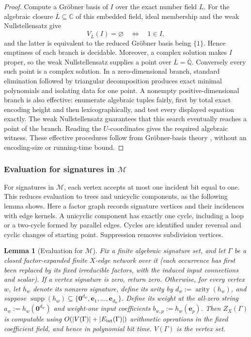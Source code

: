 \documentclass[11pt,letterpaper,onecolumn]{article}
\theoremstyle{plain}
\newtheorem{lemma}[lemma]{Lemma}
\theoremstyle{definition}
\theoremstyle{remark}
\newcommand{\AlgNums}{\overline{\mathbb Q}}
\newcommand{\cM}{\mathscr M}
\newcommand{\supp}{\operatorname{supp}}
\newcommand{\arity}{\operatorname{arity}}
\newcommand{\zero}{\mathbf 0}
\begin{document}
\begin{proof}
Compute a Gr\"obner basis of \(I\) over the exact number field \(L\).
For the algebraic closure \(\overline L\subseteq\mathbb C\) of this
embedded field, ideal membership and the weak Nullstellensatz give
\[
 V_{\overline L}(I)=\varnothing
 \quad\Longleftrightarrow\quad
 1\in I,
\]
and the latter is equivalent to the reduced Gr\"obner basis being
\(\{1\}\).  Hence emptiness of each branch is decidable.  Moreover, a
complex solution makes \(I\) proper, so the weak Nullstellensatz supplies
a point over \(\overline L=\AlgNums\). Conversely every such point is a
complex solution.  In a zero-dimensional branch, standard elimination
followed by triangular decomposition produces exact minimal polynomials and
isolating data for one point.  A nonempty positive-dimensional branch is
also effective: enumerate algebraic tuples fairly, first by total exact
encoding height and then lexicographically, and test every displayed
equation exactly.  The weak Nullstellensatz guarantees that this search
eventually reaches a point of the branch. Reading the \(U\)-coordinates
gives the required algebraic witness. These effective procedures follow
from Gr\"obner-basis theory \cite{Cohen1993,CoxLittleOShea2015}, without
an encoding-size or running-time bound.
\end{proof}

\subsubsection{Evaluation for signatures in \texorpdfstring{\(\cM\)}{M}}
\label{subsubsec:one-hot-evaluation}

For signatures in \(\cM\), each vertex accepts at most one incident
bit equal to one. This reduces evaluation to trees and unicyclic components,
as the following lemma shows. Here a factor graph records signature vertices
and their incidences with edge kernels. A unicyclic component has exactly
one cycle, including a loop or a two-cycle formed by parallel edges.
Cycles are identified under reversal and cyclic changes of starting point.
Suppression removes subdivision vertices.


\begin{lemma}[Evaluation for \(\cM\)]
\label{lem:one-hot-matching-evaluation}
Fix a finite algebraic signature set, and let \(\Gamma\) be a closed
factor-expanded finite \(X\)-edge network over it (each
occurrence has first been replaced by its fixed irreducible factors, with
the induced input connections and scalar).  If a vertex signature is
zero, return zero. Otherwise, for every vertex \(w\), let \(h_w\) denote its
nonzero signature, define its arity by \(d_w:=\arity(h_w)\),
and suppose
\(\supp(h_w)\subseteq\{\zero^{d_w},{\mathbf{e}}_1,\ldots,{\mathbf{e}}_{d_w}\}\).  Define its
weight at the all-zero string \(a_w:=h_w(\zero^{d_w})\) and weight-one input coefficients
\(b_{w,p}:=h_w({\mathbf{e}}_p)\).  Then \(Z_X(\Gamma)\) is computable using
\(O(|V(\Gamma)|+|E_{\rm int}(\Gamma)|)\) arithmetic operations in the fixed
coefficient field, and hence in polynomial bit time. \(V(\Gamma)\) is the
vertex set.
\end{lemma}
\end{document}
